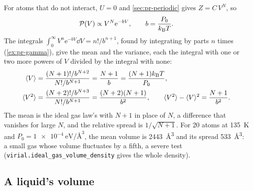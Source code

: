 For atoms that do not interact, $U = 0$ and \cref{sec:pr-periodic} gives
$Z = C\,V^N$, so
\begin{equation*}
   \mathcal{P}(V) \propto V^N\mathrm{e}^{-bV} , \qquad b = \frac{P_0}{k_{\mathrm{B}} T} .
\end{equation*}
The integrals $\int_0^\infty V^n\mathrm{e}^{-bV}\dd V = n!/b^{n+1}$, found by
integrating by parts $n$ times (\cref{ex:pr-gamma}), give the mean and the
variance, each the integral with one or two more powers of $V$ divided by
the integral with none:
\begin{align*}
   \langle V \rangle &= \frac{(N + 1)!/b^{N+2}}{N!/b^{N+1}} = \frac{N + 1}{b}
   = \frac{(N + 1)k_{\mathrm{B}} T}{P_0} ,\\
   \langle V^2 \rangle &= \frac{(N + 2)!/b^{N+3}}{N!/b^{N+1}}
   = \frac{(N + 2)(N + 1)}{b^2} , \qquad
   \langle V^2 \rangle - \langle V \rangle^2 = \frac{N + 1}{b^2} .
\end{align*}
The mean is the ideal gas law's with $N + 1$ in place of $N$, a difference
that vanishes for large $N$, and the relative spread is $1/\sqrt{N + 1}$.
For 20 atoms at \SI{135}{\kelvin} and $P_0 = \SI{1e-4}{\electronvolt\per
\angstrom\cubed}$, the mean volume is \SI{2443}{\angstrom\cubed} and its
spread \SI{533}{\angstrom\cubed}: a small gas whose volume fluctuates by a
fifth, a severe test (\texttt{virial.ideal\_gas\_volume\_density} gives
the whole density).

\subsection*{A liquid's volume}

